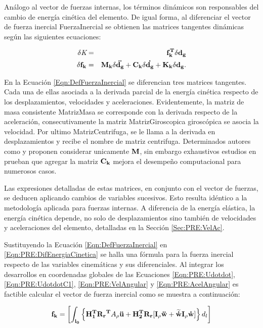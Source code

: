 Análogo al vector de fuerzas internas, los términos dinámicos son responsables del cambio de energía cinética del elemento. De igual forma, al diferenciar el vector de fuerza inercial \gls{FuerzaInercial} se obtienen las matrices tangentes dinámicas según las siguientes ecuaciones:

\begin{eqnarray}
		\label{Eqn:PRE:defFuerzaInercial}
	\delta\textit{K}&=&\bf{f_k^T}\delta\bf{d}_g\\
	\label{Eqn:DefFuerzaInercial}
	\delta\bf{f_k}&=& \bf{M}_k\delta \ddot{\bf{d_g}}+\bf{C}_k\delta
	\dot{\bf{d_g}}+\bf{K}_k\delta{\bf{d_g}}.
\end{eqnarray}


En la Ecuación \ref{Eqn:DefFuerzaInercial} se diferencian tres matrices tangentes. Cada una de ellas asociada a la derivada parcial de la energía cinética respecto de los desplazamientos, velocidades y aceleraciones. Evidentemente, la matriz de masa consistente \gls{MatrizMasa} se corresponde con la derivada respecto de la aceleración, consecutivamente la matriz \gls{MatrizGiroscopica} giroscópica se asocia la velocidad. Por ultimo \gls{MatrizCentrifuga}, se le llama a la derivada en desplazamientos y recibe el nombre de matriz centrifuga. Determinados autores como \cite{cardona1988beam} y \cite{hsiao1999consistent} proponen considerar unicamente $\bf{M}$, sin embargo exhaustivos estudios en \citep{hsiao1999consistent} prueban que agregar la matriz $\bf{C_k}$ mejora el desempeño computacional para numerosos casos.

Las expresiones detalladas de estas matrices, en conjunto con el vector de fuerzas, se deducen aplicando cambios de variables sucesivos. Esto resulta idéntico a la metodología aplicada para fuerzas internas. A diferencia de la energía elástica, la energía cinética depende, no solo de desplazamientos sino también de velocidades y aceleraciones del elemento, detalladas en la Sección \ref{Sec:PRE:VelAc}.

Sustituyendo la Ecuación \eqref{Eqn:DefFuerzaInercial} en \eqref{Eqn:PRE:DifEnergiaCinetica} se halla una fórmula para la fuerza inercial respecto de las variables cinemáticas y sus diferenciales. Al integrar los desarrollos en coordenadas globales de las Ecuaciones \eqref{Eqn:PRE:Udotdot}, \eqref{Eqn:PRE:UdotdotC1}, \eqref{Eqn:PRE:VelAngular} y \eqref{Eqn:PRE:AcelAngular}  es factible calcular el vector de fuerza inercial como se muestra a continuación:

\begin{equation}\label{Eqn:PRE:FuerzaInercial}
\bf{f}_k=\left [ \int _{l_0} \left \{ \bf{H}_1^T\bf{R_r}^T \text{$A_\rho$}\ddot{\bf{u}} +\bf{H}_2^T \bf{R_r} [\bf{I}_\rho\ddot{\bf{w}}+\widetilde{\dot{\bf{w}}}\bf{I}_\rho\dot{w}] \right \} \text{$d_l$} \right  ]
\end{equation}

